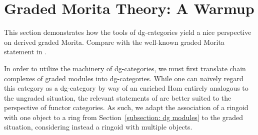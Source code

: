 \chapter{Graded Morita Theory: A Warmup} \label{chapter: graded Morita}

This section demonstrates how the tools of dg-categories yield a nice perspective on derived graded Morita. Compare with the well-known graded Morita statement in \parencite{Zhang96}. 

In order to utilize the machinery of dg-categories, we must first translate chain complexes of graded modules into dg-categories.
While one can na\"ively regard this category as a dg-category by way of an enriched Hom entirely analogous to the ungraded situation, the relevant statements of \parencite{Toen07} are better suited to the perspective of functor categories.
As such, we adapt the association of a ringoid with one object to a ring from Section~\ref{subsection: dg modules} to the graded situation, considering instead a ringoid with multiple objects.


